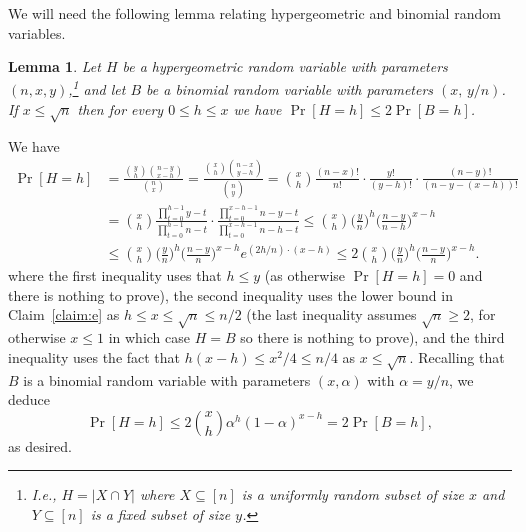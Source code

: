 \documentclass[11pt]{article}
\makeatletter
\renewenvironment{proof}[1][\proofname]
{\par\pushQED{\qed}
	\normalfont\topsep6\p@\@plus6\p@\relax\trivlist
	\item[\hskip\labelsep\bfseries#1\@addpunct{.}]
	\ignorespaces}
{\popQED\endtrivlist\@endpefalse}
\newtheorem{lemma}[theo]{Lemma}
\renewcommand{\a}{\alpha}
\newcommand{\sub}{\subseteq}
\makeatother
\begin{document}
We will need the following lemma relating hypergeometric and binomial random variables.
\begin{lemma}\label{lemma:HG}
	Let $H$ be a hypergeometric random variable with parameters 
$(n,x,y)$,\footnote{I.e., $H=|X \cap Y|$ where $X \sub [n]$ is a 
uniformly random subset of size $x$ and $Y \sub [n]$ is a fixed 
subset of size $y$.} 
	and let $B$ be a binomial random variable with parameters $(x,\, y/n)$.
	If $x \le \sqrt{n}$ then for every $0 \le h \le x$ we have $\Pr[H=h] \le 2\Pr[B=h]$.
\end{lemma}
\begin{proof}
	We have
	\begin{align*}
	\Pr[H=h] &= 
	\frac{\binom{y}{h}\binom{n-y}{x-h}}{\binom{n}{x}} 
	=\frac{\binom{x}{h}\binom{n-x}{y-h}}{\binom{n}{y}}
	= \binom{x}{h}\frac{(n-x)!}{n!}\cdot\frac{y!}{(y-h)!}\cdot\frac{(n-y)!}{(n-y-(x-h))!}\\
	&= \binom{x}{h}\frac{\prod_{t=0}^{h-1} y-t}{\prod_{t=0}^{h-1} n-t} 
	\cdot \frac{\prod_{t=0}^{x-h-1} n-y-t}{\prod_{t=0}^{x-h-1} n-h-t}
	\le \binom{x}{h}\bigg(\frac{y}{n}\bigg)^h\bigg(\frac{n-y}{n-h}\bigg)^{x-h} \\
	&\le \binom{x}{h}\bigg(\frac{y}{n}\bigg)^h\bigg
	(\frac{n-y}{n}\bigg)^{x-h} e^{(2h/n)\cdot(x-h)}
	\le 2\binom{x}{h} \bigg(\frac{y}{n}\bigg)^h\bigg
	(\frac{n-y}{n}\bigg)^{x-h}.
	\end{align*}
	where the first inequality uses that $h \le y$ (as otherwise 
$\Pr[H=h]=0$ and there is nothing to prove), the second inequality 
uses the lower bound in Claim~\ref{claim:e}
as $h \le x \le \sqrt{n} \le n/2$ (the last inequality assumes $\sqrt{n} \ge 2$, for otherwise $x \le 1$ in which case $H=B$ so there is nothing to prove),
and the third inequality uses the fact that $h(x-h) \le x^2/4 \le n/4$
	as $x \le \sqrt{n}$. 
	Recalling that $B$ is a binomial random variable with parameters $(x,\a)$ with $\a=y/n$, we deduce
	$$\Pr[H=h] \le 2\binom{x}{h} \a^h(1-\a)^{x-h} = 2\Pr[B=h] ,$$
	as desired.
\end{proof}
\end{document}
